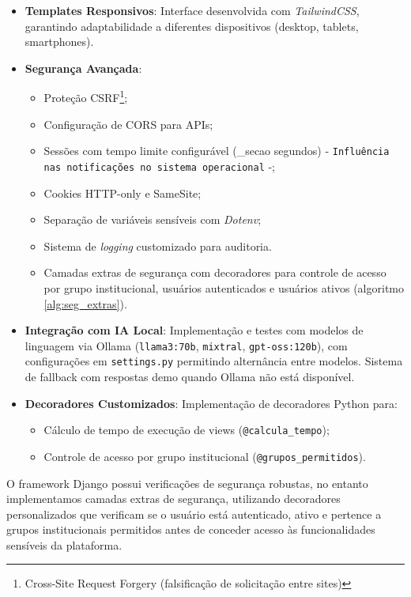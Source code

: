 \begin{itemize}
\item \textbf{Templates Responsivos}: Interface desenvolvida com \textit{TailwindCSS}, garantindo adaptabilidade a diferentes dispositivos (desktop, tablets, smartphones).

\item \textbf{Segurança Avançada}: 
   \begin{itemize}
      \item Proteção CSRF\footnote{Cross-Site Request Forgery (falsificação de solicitação entre sites)};
      \item Configuração de CORS para APIs;
      \item Sessões com tempo limite configurável (\tempo_secao{} segundos) - \texttt{Influência nas notificações no sistema operacional} -;
      \item Cookies HTTP-only e SameSite;
      \item Separação de variáveis sensíveis com \textit{Dotenv};
      \item Sistema de \textit{logging} customizado para auditoria.
      \item Camadas extras de segurança com decoradores para controle de acesso por grupo institucional, usuários autenticados e usuários ativos (algoritmo \ref{alg:seg_extras}).
   \end{itemize}

\item \textbf{Integração com IA Local}: Implementação e testes com modelos de linguagem via Ollama (\texttt{llama3:70b}, \texttt{mixtral}, \texttt{gpt-oss:120b}), com configurações em \texttt{settings.py} permitindo alternância entre modelos. Sistema de fallback com respostas demo quando Ollama não está disponível.

\item \textbf{Decoradores Customizados}: Implementação de decoradores Python para:
   \begin{itemize}
      \item Cálculo de tempo de execução de views (\texttt{@calcula\_tempo});
      \item Controle de acesso por grupo institucional (\texttt{@grupos\_permitidos}).
   \end{itemize}
\end{itemize}


\par O framework Django possui verificações de segurança robustas, no entanto implementamos camadas extras de segurança, utilizando decoradores personalizados que verificam se o usuário está autenticado, ativo e pertence a grupos institucionais permitidos antes de conceder acesso às funcionalidades sensíveis da plataforma.


